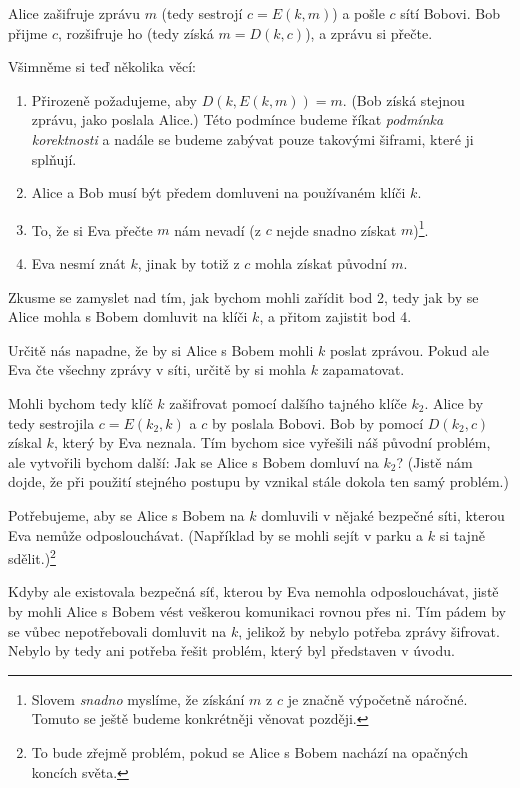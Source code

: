 \documentclass[
  program=infoi,
  biblatex,
  figures=false,
  glossaries,
  index
]{kidiplom}
\begin{document}
    Alice zašifruje zprávu $m$ (tedy sestrojí $c=E(k,m)$) a pošle $c$ sítí Bobovi.
    Bob přijme $c$, rozšifruje ho (tedy získá $m=D(k,c)$), a zprávu si přečte.

    \medskip

    Všimněme si teď několika věcí:
    
    \begin{enumerate}
        \item
            Přirozeně požadujeme, aby $D(k, E(k, m))=m$.
            (Bob získá stejnou zprávu, jako poslala Alice.)
            Této podmínce budeme říkat \emph{podmínka korektnosti} a nadále se budeme
            zabývat pouze takovými šiframi, které ji splňují.
        \item
            Alice a Bob musí být předem domluveni na používaném klíči $k$.
        \item
            To, že si Eva přečte $m$ nám nevadí (z $c$ nejde snadno získat $m$)\footnote{Slovem \emph{snadno} myslíme, že získání
            $m$ z $c$ je značně výpočetně náročné. Tomuto se ještě budeme konkrétněji věnovat později.}.
        \item
            Eva nesmí znát $k$, jinak by totiž z $c$ mohla získat původní $m$.
    \end{enumerate}

    Zkusme se zamyslet nad tím, jak bychom mohli zařídit bod 2, tedy jak by se Alice mohla s Bobem
    domluvit na klíči $k$, a přitom zajistit bod 4.

    \medskip

    Určitě nás napadne, že by si Alice s Bobem mohli $k$ poslat zprávou.
    Pokud ale Eva čte všechny zprávy v síti, určitě by si mohla $k$ zapamatovat.

    Mohli bychom tedy klíč $k$ zašifrovat pomocí dalšího tajného klíče $k_2$.
    Alice by tedy sestrojila $c = E(k_2, k)$ a $c$ by poslala Bobovi.
    Bob by pomocí $D(k_2, c)$ získal $k$, který by Eva neznala.
    Tím bychom sice vyřešili náš původní problém, ale vytvořili bychom další: Jak se Alice s Bobem domluví
    na $k_2$? (Jistě nám dojde, že při použití stejného postupu by vznikal stále dokola ten samý problém.)
    
    Potřebujeme, aby se Alice s Bobem na $k$ domluvili v nějaké bezpečné síti, kterou Eva nemůže odposlouchávat.
    (Například by se mohli sejít v parku a $k$ si tajně sdělit.)\footnote{To bude zřejmě problém, pokud se Alice s Bobem
    nachází na opačných koncích světa.}

    Kdyby ale existovala bezpečná síť, kterou by Eva nemohla
    odposlouchávat, jistě by mohli Alice s Bobem vést veškerou komunikaci rovnou přes ni.
    Tím pádem by se vůbec nepotřebovali domluvit na $k$, jelikož
    by nebylo potřeba zprávy šifrovat. Nebylo by tedy ani potřeba řešit problém, který byl představen v úvodu.
\end{document}
